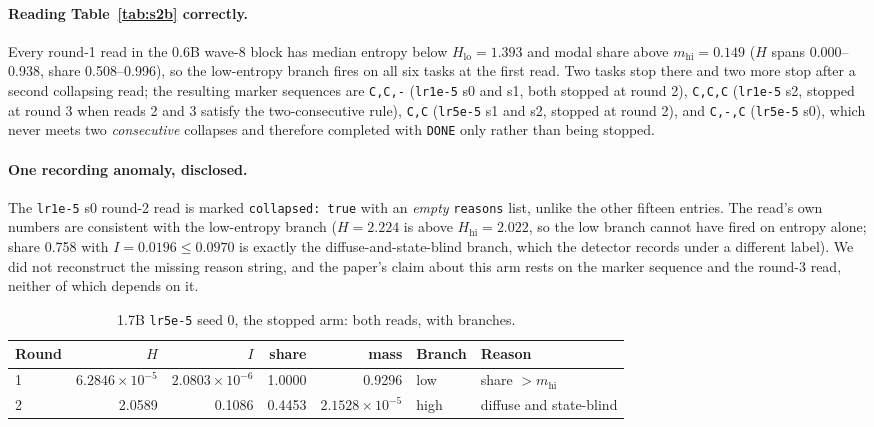 \documentclass[11pt,a4paper]{article}
\begin{document}
\paragraph{Reading Table~\ref{tab:s2b} correctly.} Every round-1 read in the 0.6B wave-8 block has
median entropy below $H_{\mathrm{lo}}{=}1.393$ and modal share above $m_{\mathrm{hi}}{=}0.149$
($H$ spans 0.000--0.938, share 0.508--0.996), so the low-entropy branch fires on all six tasks at
the first read. Two tasks stop there and two more stop after a second collapsing read; the resulting
marker sequences are \texttt{C,C,-} (\texttt{lr1e-5} s0 and s1, both stopped at round 2),
\texttt{C,C,C} (\texttt{lr1e-5} s2, stopped at round 3 when reads 2 and 3 satisfy the
two-consecutive rule), \texttt{C,C} (\texttt{lr5e-5} s1 and s2, stopped at round 2), and
\texttt{C,-,C} (\texttt{lr5e-5} s0), which never meets two \emph{consecutive} collapses and
therefore completed with \texttt{DONE} only rather than being stopped.

\paragraph{One recording anomaly, disclosed.} The \texttt{lr1e-5} s0 round-2 read is marked
\texttt{collapsed: true} with an \emph{empty} \texttt{reasons} list, unlike the other fifteen
entries. The read's own numbers are consistent with the low-entropy branch ($H{=}2.224$ is above
$H_{\mathrm{hi}}{=}2.022$, so the low branch cannot have fired on entropy alone; share 0.758 with
$I{=}0.0196 \leq 0.0970$ is exactly the diffuse-and-state-blind branch, which the detector records
under a different label). We did not reconstruct the missing reason string, and the paper's claim
about this arm rests on the marker sequence and the round-3 read, neither of which depends on it.

\begin{table}[h]
\centering
\small
\caption{1.7B \texttt{lr5e-5} seed 0, the stopped arm: both reads, with branches.}
\label{tab:s2c}
\begin{tabular}{@{}lrrrrl l@{}}
\toprule
\textbf{Round} & $H$ & $I$ & \textbf{share} & \textbf{mass} & \textbf{Branch} & \textbf{Reason} \\
\midrule
1 & $6.2846\times10^{-5}$ & $2.0803\times10^{-6}$ & 1.0000 & 0.9296 & low & share $>m_{\mathrm{hi}}$ \\
2 & 2.0589 & 0.1086 & 0.4453 & $2.1528\times10^{-5}$ & high & diffuse and state-blind \\
\bottomrule
\end{tabular}
\end{table}
\end{document}
